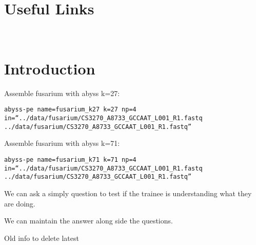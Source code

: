 \section{Useful Links}
 
\begin{description}[style=multiline,labelindent=0cm,align=left,leftmargin=0.5cm]
  \item[]\hfill\\
    \url{}
\end{description}

\newpage

\section{Introduction}


\begin{information}
\end{information}

\begin{note}
\end{note}


\begin{steps}
Assemble fusarium with abyss k=27:
\begin{lstlisting}
abyss-pe name=fusarium_k27 k=27 np=4 in=“../data/fusarium/CS3270_A8733_GCCAAT_L001_R1.fastq ../data/fusarium/CS3270_A8733_GCCAAT_L001_R1.fastq”
\end{lstlisting}
\end{steps}

\begin{steps}
Assemble fusarium with abyss k=71:
\begin{lstlisting}
abyss-pe name=fusarium_k71 k=71 np=4 in=“../data/fusarium/CS3270_A8733_GCCAAT_L001_R1.fastq ../data/fusarium/CS3270_A8733_GCCAAT_L001_R1.fastq”
\end{lstlisting}
\end{steps}

\begin{questions}
We can ask a simply question to test if the trainee is understanding what they are doing. 
\begin{answer}
We can maintain the answer along side the questions.
\end{answer}
\end{questions}

Old info to delete latest



